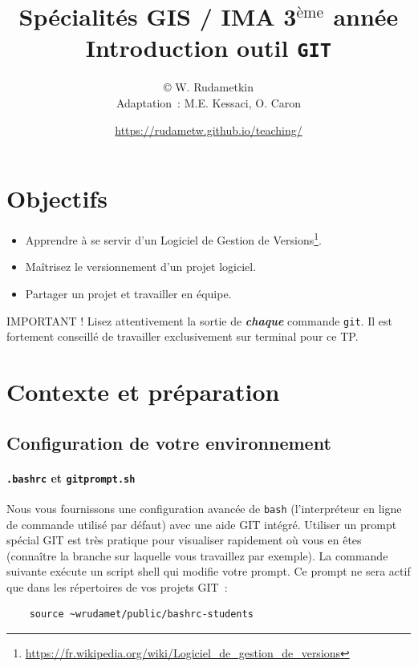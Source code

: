 \documentclass[final, a4paper, openbib, ]{article}
\title{Spécialités GIS / IMA 3$^{\mbox{\`eme}}$ année\\
\huge \textbf{Introduction outil \texttt{GIT}
}}
\author{\copyright{} W. Rudametkin\\
	Adaptation~: M.E. Kessaci, O. Caron}
\date{\Large \url{https://rudametw.github.io/teaching/}}%
\begin{document}
\vspace{-5cm}
\posttitle{\par\end{center}}
\setlength{\droptitle}{-45pt}
\maketitle

\vspace{-1.2cm}
\section{Objectifs}\label{objectifs}

\begin{itemize}
\item Apprendre à se servir d'un Logiciel de Gestion de Versions\footnote{\url{https://fr.wikipedia.org/wiki/Logiciel_de_gestion_de_versions}}.
\item Maîtrisez le versionnement d'un projet logiciel.
\item Partager un projet et travailler en équipe.
\end{itemize}

\begin{alertinfo}{IMPORTANT !}
Lisez attentivement la sortie de \textbf{\textit{chaque}} commande \texttt{git}.
Il est fortement conseillé de travailler exclusivement sur terminal pour ce TP.
\end{alertinfo}

\section{Contexte et préparation}
\label{context} 

\subsection{Configuration de votre environnement}

\paragraph{\texttt{.bashrc} et \texttt{gitprompt.sh}}
Nous vous fournissons une configuration avancée de \texttt{bash} (l'interpréteur en ligne de commande utilisé par défaut) avec une aide GIT intégré.
Utiliser un prompt spécial GIT est très pratique pour visualiser rapidement où vous en êtes (connaître la branche sur laquelle vous travaillez par exemple). La commande suivante exécute un script shell qui modifie votre prompt. Ce prompt ne sera actif que dans les répertoires de vos projets GIT~: 
\begin{verbatim}
	source ~wrudamet/public/bashrc-students
\end{verbatim}
\end{document}
